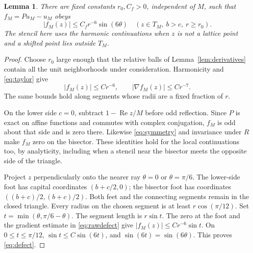 \documentclass[11pt]{article}
\newtheorem{lemma}{Lemma}
\begin{document}
\begin{lemma}\label{lem:defect}
There are fixed constants $r_0,C_f>0$, independent of $M$, such that
$f_M=Pu_M-u_M$ obeys
\begin{equation}\label{eq:defect}
 |f_M(z)|\le C_f r^{-6}\sin(6\theta)
 \quad(z\in T_M,\ b>c,\ r\ge r_0).
\end{equation}
The stencil here uses the harmonic continuations when $z$ is not a lattice
point and a shifted point lies outside $T_M$.
\end{lemma}
\begin{proof}
Choose $r_0$ large enough that the relative balls of
Lemma~\ref{lem:derivatives} contain all the unit neighborhoods under
consideration. Harmonicity and \eqref{eq:taylor} give
\begin{equation}\label{eq:rawdefect}
 |f_M(z)|\le Cr^{-6},\qquad |\nabla f_M(z)|\le Cr^{-7}.
\end{equation}
The same bounds hold along segments whose radii are a fixed fraction of $r$.

On the lower side $c=0$, subtract $1-\operatorname{Re}z/M$ before odd
reflection. Since $P$ is exact on affine functions and commutes with complex
conjugation, $f_M$ is odd about that side and is zero there.
Likewise \eqref{eq:symmetry} and invariance under $R$ make $f_M$ zero on
the bisector. These identities hold for the local continuations too, by
analyticity, including when a stencil near the bisector meets the opposite
side of the triangle.

Project $z$ perpendicularly onto the nearer ray $\theta=0$ or
$\theta=\pi/6$. The lower-side foot has capital coordinates $(b+c/2,0)$;
the bisector foot has coordinates $((b+c)/2,(b+c)/2)$.
Both feet and the connecting segments remain in the closed triangle.
Every radius on the chosen segment is at least $r\cos(\pi/12)$.
Set $t=\min(\theta,\pi/6-\theta)$. The segment length is $r\sin t$.
The zero at the foot and the gradient estimate in \eqref{eq:rawdefect} give
$|f_M(z)|\le Cr^{-6}\sin t$. On $0\le t\le\pi/12$,
$\sin t\le C\sin(6t)$, and $\sin(6t)=\sin(6\theta)$.
This proves \eqref{eq:defect}.
\end{proof}
\end{document}
